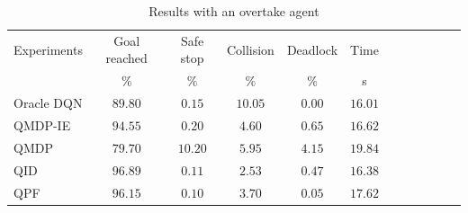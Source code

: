 \begin{table}
\caption{Results with an overtake agent}
\label{tab:theis_results_overtake}
\begin{tabularx}{\columnwidth}{@{}l*{10}{c}c@{}}
\toprule
Experiments & Goal reached & Safe stop & Collision & Deadlock & Time \\ 
			& $\%$ & $\%$ & $\%$ & $\%$ & s \\ 
\midrule
Oracle DQN & $89.80$ & $0.15$ & $10.05$ & $0.00$ & $16.01$ \\ 
\rowcolor{gray!20} {QMDP-IE} & ${94.55}$ & ${0.20}$ & ${4.60}$ & ${0.65}$ & ${16.62}$ \\ 
QMDP & $79.70$ & $10.20$ & $5.95$ & $4.15$ & $19.84$ \\ 
\rowcolor{gray!20} {QID} & ${96.89}$ & ${0.11}$ & ${2.53}$ & ${0.47}$ & ${16.38}$ \\ 
QPF & $96.15$ & $0.10$ & $3.70$ & $0.05$ & $17.62$ \\ 
\bottomrule
\end{tabularx}
\end{table}

% 			


% 			

